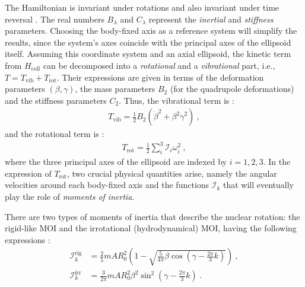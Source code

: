 The Hamiltonian is invariant under rotations and also invariant under time reversal \cite{messiah2014quantum}. The real numbers $B_\lambda$ and $C_\lambda$ represent the \emph{inertial} and \emph{stiffness} parameters. Choosing the body-fixed axis as a reference system will simplify the results, since the system's axes coincide with the principal axes of the ellipsoid itself. Assuming this coordinate system and an axial ellipsoid, the kinetic term from $H_\text{coll}$ can be decomposed into a \emph{rotational} and a \emph{vibrational} part, i.e., $T=T_\text{vib}+T_\text{rot}$. Their expressions are given in terms of the deformation parameters $(\beta,\gamma)$, the mass parameters $B_2$ (for the quadrupole deformations) and the stiffness parameters $C_2$. Thus, the vibrational term is \cite{li2022model}:
\begin{align}
    T_\text{vib}=\frac{1}{2}B_2\left(\dot{\beta}^2+\beta^2\dot{\gamma}^2\right)\ ,
    \label{kinetic-vibrational-energy-collective}
\end{align}
and the rotational term is \cite{li2022model}:
\begin{align}
    T_\text{rot}=\frac{1}{2}\sum_i^3\mathcal{I}_i\omega_i^2\ ,
    \label{kinetic-rotational-energy-collective}
\end{align}
where the three principal axes of the ellipsoid are indexed by $i=1,2,3$. In the expression of $T_\text{rot}$, two crucial physical quantities arise, namely the angular velocities around each body-fixed axis and the functions $\mathcal{I}_k$ that will eventually play the role of \emph{moments of inertia}. 

There are two types of moments of inertia that describe the nuclear rotation: the rigid-like MOI and the irrotational (hydrodynamical) MOI, having the following expressions \cite{bohr1954rotational,ring2004nuclear}:
\begin{align}
    \mathcal{I}_k^\text{rig}&=\frac{2}{5}mAR_0^2\left(1-\sqrt{\frac{5}{4\pi}\beta\cos\left(\gamma-\frac{2\pi}{3}k\right)}\right)\ ,\\
    \mathcal{I}_k^\text{irr}&=\frac{3}{2\pi}mAR_0^2\beta^2\sin^2\left(\gamma-\frac{2\pi}{3}k\right)\ .
    \label{eq-irrotational-rigid-mois}
\end{align}

